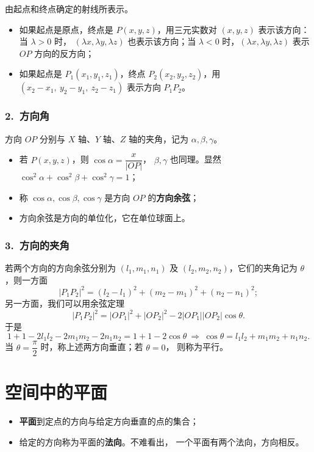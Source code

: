 \documentclass[UTF8,11pt]{ctexart}
\theoremstyle{cnthm}
\begin{document}
由起点和终点确定的射线所表示。

\begin{itemize}
\item 如果起点是原点，终点是 $P(x,y,z)$，用三元实数对
$(x,y,z)$ 表示该方向：当 $\lambda>0$ 时，
$(\lambda x,\lambda y,\lambda z)$ 也表示该方向；当
$\lambda<0$ 时，$(\lambda x,\lambda y,\lambda z)$ 表示
$OP$ 方向的反方向；
\item 如果起点是 $P_1(x_1,y_1,z_1)$，终点
$P_2(x_2,y_2,z_2)$，用
$(x_2-x_1,\ y_2-y_1,\ z_2-z_1)$ 表示方向 $P_1P_2$。
\end{itemize}

\subsubsection*{2.\ 方向角}

方向 $OP$ 分别与 $X$ 轴、$Y$ 轴、$Z$ 轴的夹角，记为
$\alpha,\beta,\gamma$。

\begin{itemize}
\item 若 $P(x,y,z)$，则 $\cos\alpha=\dfrac{x}{|OP|}$，
$\beta,\gamma$ 也同理。显然
$\cos^2\alpha+\cos^2\beta+\cos^2\gamma=1$；
\item 称 $\cos\alpha,\cos\beta,\cos\gamma$ 是方向 $OP$
的\textbf{方向余弦}；
\item 方向余弦是方向的单位化，它在单位球面上。
\end{itemize}

\subsubsection*{3.\ 方向的夹角}

若两个方向的方向余弦分别为 $(l_1,m_1,n_1)$ 及
$(l_2,m_2,n_2)$，它们的夹角记为 $\theta$，则一方面
\[
|P_1P_2|^2=(l_2-l_1)^2+(m_2-m_1)^2+(n_2-n_1)^2 ;
\]
另一方面，我们可以用余弦定理
\[
|P_1P_2|^2=|OP_1|^2+|OP_2|^2-2|OP_1||OP_2|\cos\theta .
\]
于是
\[
1+1-2l_1l_2-2m_1m_2-2n_1n_2=1+1-2\cos\theta
\ \Longrightarrow\
\cos\theta=l_1l_2+m_1m_2+n_1n_2 .
\]
当 $\theta=\dfrac\pi2$ 时，称上述两方向垂直；若 $\theta=0$，
则称为平行。

\section{空间中的平面}

\begin{itemize}
\item \textbf{平面}\quad 到定点的方向与给定方向垂直的点的集合；
\item 给定的方向称为平面的\textbf{法向}。不难看出，
一个平面有两个法向，方向相反。
\end{itemize}
\end{document}
